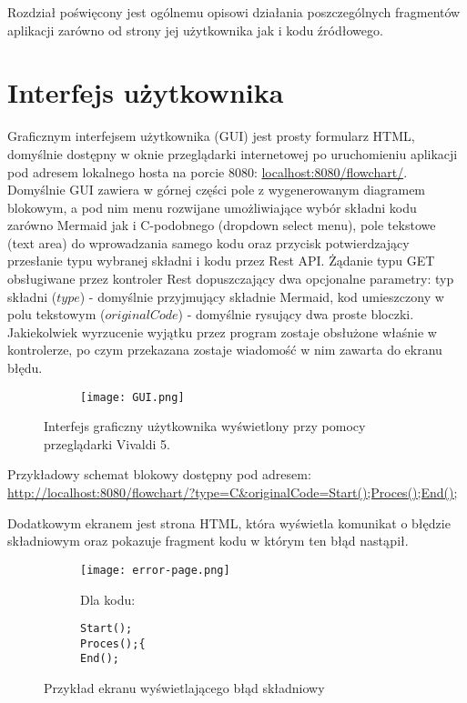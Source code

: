 	Rozdział poświęcony jest ogólnemu opisowi działania poszczególnych fragmentów aplikacji zarówno od strony jej użytkownika jak i kodu źródłowego.

\section{Interfejs użytkownika}
	Graficznym interfejsem użytkownika (GUI) jest prosty formularz HTML, domyślnie dostępny w oknie przeglądarki internetowej po uruchomieniu aplikacji pod adresem lokalnego hosta na porcie 8080: 
	\smallbreak
	\href{http://localhost:8080/flowchart/}{localhost:8080/flowchart/}.
	\bigbreak	
	Domyślnie GUI zawiera w górnej części pole z wygenerowanym diagramem blokowym, a pod nim  menu rozwijane umożliwiające wybór składni kodu zarówno Mermaid jak i C-podobnego (dropdown select menu), pole tekstowe (text area) do wprowadzania samego kodu oraz przycisk potwierdzający przesłanie typu wybranej składni i kodu przez Rest API. Żądanie typu GET obsługiwane przez kontroler Rest dopuszczający dwa opcjonalne parametry: typ składni ($type$) - domyślnie przyjmujący składnie Mermaid, kod umieszczony w polu tekstowym ($originalCode$) - domyślnie rysujący dwa proste bloczki. Jakiekolwiek wyrzucenie wyjątku przez program zostaje obsłużone właśnie w kontrolerze, po czym przekazana zostaje wiadomość w nim zawarta do ekranu błędu.

	
				\begin{figure}[H]
  \begin{subfigure}{\textwidth}
    \centering
    \texttt{[image: GUI.png]}
  \end{subfigure}\hfill
  \caption{Interfejs graficzny użytkownika wyświetlony przy pomocy przeglądarki Vivaldi 5. }
\end{figure}

Przykładowy schemat blokowy dostępny pod adresem: 
	\smallbreak
	\href{http://localhost:8080/flowchart/?type=C\&originalCode=Start();Proces();End();}{http://localhost:8080/flowchart/?type=C\&originalCode=Start();Proces();End();}
	\bigbreak
	
	Dodatkowym ekranem jest strona HTML, która wyświetla komunikat o błędzie składniowym oraz pokazuje fragment kodu w którym ten błąd nastąpił.
	
\begin{figure}[H]
  \begin{subfigure}{\textwidth}
  \centering
    \texttt{[image: error-page.png]}
  \end{subfigure}\hfill
    \begin{subfigure}[t]{0.44\textwidth}
    \bigbreak
    Dla kodu:
    \centering
    \begin{verbatim}    
Start();
Proces();{
End();
    \end{verbatim}
  \end{subfigure}%
  \caption{Przykład ekranu wyświetlającego błąd składniowy}
\end{figure}


